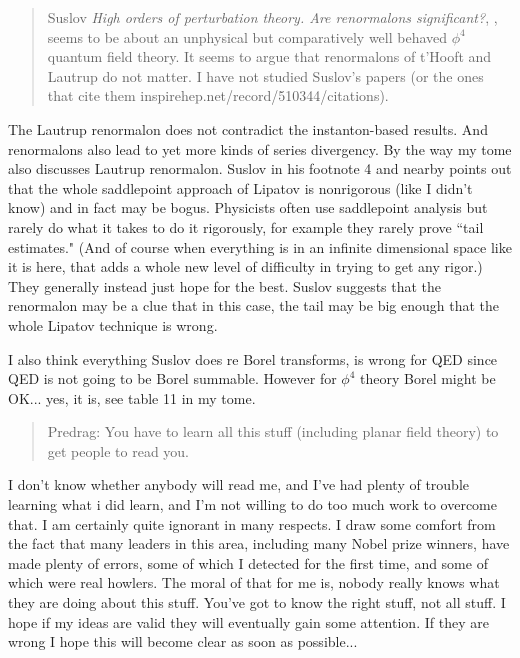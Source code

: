 \begin{description}
\begin{quote}
Suslov
   {\em High orders of perturbation theory. {Are} renormalons significant?},
    ,
    seems to be about an unphysical but comparatively well behaved
$\phi^4$ quantum field theory.
It seems to argue that renormalons of t'Hooft and Lautrup do not matter. I
   have not studied Suslov's papers (or the ones that cite
   them 
   {inspirehep.net/record/510344/citations}).
\end{quote}
The Lautrup renormalon does not contradict the instanton-based results.
And renormalons also lead to yet more kinds of series divergency.
By the way my tome also discusses Lautrup renormalon.
Suslov in his footnote 4 and nearby points out that the whole
saddlepoint approach of Lipatov is nonrigorous (like I didn't know)
and in fact may be bogus.   Physicists often
use saddlepoint analysis but rarely do what it takes to do it
rigorously, for example they
rarely prove ``tail estimates."  (And of course when everything is in
an infinite dimensional space like it is here, that adds a whole new
level of difficulty in trying
to get any rigor.)  They generally instead just hope for the best.
Suslov suggests that the renormalon may be a clue that in this case, the
tail may be big enough that the whole Lipatov technique is wrong.

I also think everything Suslov does re Borel transforms, is wrong for QED since
QED is not going to be Borel summable.  However for $\phi^4$ theory
Borel might be OK... yes, it is, see table 11 in my tome.


\begin{quote} Predrag:
   You have to learn all this stuff (including
   {planar field theory}) to get people to read you.
\end{quote}

I don't know whether anybody will read me, and I've had plenty of
trouble learning what i did learn, and I'm not willing to do too much
work to overcome that.
 I am certainly quite ignorant in many respects.  I draw some comfort
from the fact that many leaders in this area, including many Nobel
prize winners, have made plenty of errors, some of which I detected
for the first time, and some of which were real howlers.   The moral
of that for me is, nobody really knows what they are doing about this
stuff.  You've got to know the right stuff, not all stuff.  I hope if
my ideas are valid they will eventually gain some attention. If they
are wrong I hope this will become clear as soon as possible...

\end{description}
